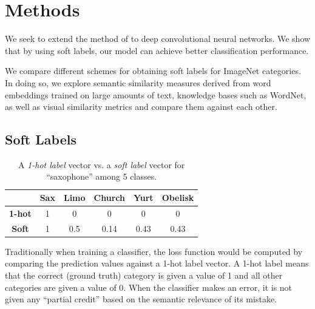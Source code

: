\section{Methods}

We seek to extend the method of \cite{zhao2011large} to deep convolutional
neural networks.  We show that by using soft labels, our model can achieve
better classification performance.



We compare different schemes for obtaining soft labels for ImageNet
categories.  In doing so, we explore semantic similarity measures derived from
word embeddings trained on large amounts of text, knowledge bases such as 
WordNet, as well as visual similarity metrics and compare them against each
other.


\subsection{Soft Labels}
\label{sec:soft_labels}

\begin{table}[!tb]
  \centering
  \begin{tabular}{|c|c|c|c|c|c|}
    \hline
      & Sax & Limo & Church & Yurt & Obelisk \\
    \hline
      \textbf{1-hot} & 1 & 0 & 0 & 0  & 0 \\
    \hline
      \textbf{Soft} & 1 & 0.5 & 0.14 & 0.43 & 0.43 \\
    \hline
  \end{tabular}
  \caption{
    A \emph{1-hot label} vector vs. a \emph{soft label} vector for
    ``saxophone'' among 5 classes.
  }
  \label{tbl:soft_labels}
\end{table}

Traditionally when training a classifier, the loss function would be computed
by comparing the prediction values against a 1-hot label vector.
A 1-hot label means that the correct (ground truth) category is given a value
of 1 and all other categories are given a value of 0.
When the classifier makes an error, it is not given any ``partial credit''
based on the semantic relevance of its mistake.

